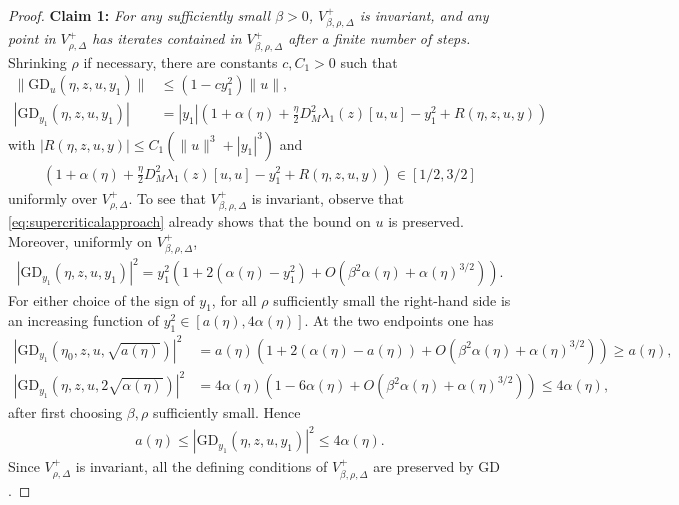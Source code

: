 \documentclass{article}
\newcommand{\GD}{\mathrm{GD}}
\theoremstyle{plain}
\theoremstyle{definition}
\theoremstyle{remark}
\begin{document}
\begin{proof}
    \noindent\textbf{Claim 1: }\emph{For any sufficiently small $\beta>0$, $V^+_{\beta,\rho,\Delta}$ is invariant, and any point in $V^+_{\rho,\Delta}$ has iterates contained in $V^+_{\beta,\rho,\Delta}$ after a finite number of steps.} Shrinking $\rho$ if necessary, there are constants $c,C_1>0$ such that
    \begin{align}\label{eq:supercriticalapproach}
        \|\GD_u(\eta,z,u,y_1)\|&\leq (1-cy_{1}^2)\|u\|,\\
        |\GD_{y_1}(\eta,z,u,y_1)|
        &=|y_{1}|\left(1+\alpha(\eta)+\frac{\eta}{2}D^2_M\lambda_1(z)[u,u]-y_{1}^2+R(\eta,z,u,y)\right)
    \end{align}
    with $|R(\eta,z,u,y)|\leq C_1(\|u\|^3+|y_{1}|^3)$ and
    \begin{align}\label{eq:factorbounds}
        \left(1+\alpha(\eta)+\frac{\eta}{2}D^2_M\lambda_1(z)[u,u]-y_{1}^2+R(\eta,z,u,y)\right)\in[1/2,3/2]
    \end{align}
    uniformly over $V^+_{\rho,\Delta}$. To see that $V^+_{\beta,\rho,\Delta}$ is invariant, observe that \eqref{eq:supercriticalapproach} already shows that the bound on $u$ is preserved. Moreover, uniformly on $V^+_{\beta,\rho,\Delta}$,
    \begin{align}
        |\GD_{y_1}(\eta,z,u,y_1)|^2
        =
        y_1^2\left(1+2(\alpha(\eta)-y_1^2)
        +O(\beta^2\alpha(\eta)+\alpha(\eta)^{3/2})\right).
    \end{align}
    For either choice of the sign of $y_1$, for all $\rho$ sufficiently small the right-hand side is an increasing function of $y_1^2\in[a(\eta),4\alpha(\eta)]$. At the two endpoints one has
    \begin{align}
        |\GD_{y_1}(\eta_0,z,u,\sqrt{a(\eta)})|^2
        &=a(\eta)\left(1+2(\alpha(\eta)-a(\eta))
        +O(\beta^2\alpha(\eta)+\alpha(\eta)^{3/2})\right)
        \geq a(\eta),\\
        |\GD_{y_1}(\eta,z,u,2\sqrt{\alpha(\eta)})|^2
        &=4\alpha(\eta)\left(1-6\alpha(\eta)
        +O(\beta^2\alpha(\eta)+\alpha(\eta)^{3/2})\right)
        \leq4\alpha(\eta),
    \end{align}
    after first choosing $\beta,\rho$ sufficiently small. Hence
    \begin{align}
        a(\eta)
        \leq |\GD_{y_1}(\eta,z,u,y_1)|^2
        \leq4\alpha(\eta).
    \end{align}
    Since $V^+_{\rho,\Delta}$ is invariant, all the defining conditions of $V^+_{\beta,\rho,\Delta}$ are preserved by $\GD$.
    

\end{proof}
\end{document}
